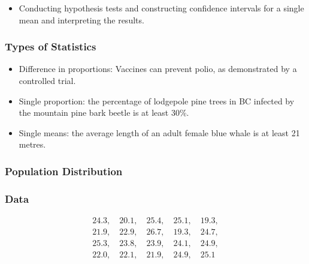 \documentclass{beamer}
\begin{document}
\begin{frame}
  \begin{itemize}
    \item[] 
      Conducting hypothesis tests and constructing confidence intervals
      for a single mean and interpreting the results.
  \end{itemize}
\end{frame}

\begin{frame}
  \frametitle{Types of Statistics}
  \begin{itemize}
    \item[] 
      Difference in proportions: Vaccines can prevent polio, as
      demonstrated by a controlled trial. 
      \vspace{0.5cm}
    \item[] 
      Single proportion: the percentage of lodgepole pine trees in BC
      infected by the mountain pine bark beetle is at least 30\%.
      \vspace{0.5cm}
    \item[] 
      Single means: the average length of an adult female blue whale
      is at least 21 metres. 
  \end{itemize}
\end{frame}

\begin{frame}
  \frametitle{Population Distribution}
  \centering
\end{frame}

\begin{frame}
  \frametitle{Data}
  \begin{displaymath}
    \begin{array}{l}
      24.3, \quad 
      20.1, \quad 
      25.4, \quad 
      25.1, \quad 
      19.3, \\[1em]
      21.9, \quad 
      22.9, \quad 
      26.7, \quad 
      19.3, \quad 
      24.7, \\[1em]
      25.3, \quad 
      23.8, \quad 
      23.9, \quad 
      24.1, \quad 
      24.9, \\[1em]
      22.0, \quad
      22.1, \quad 
      21.9, \quad 
      24.9, \quad 
      25.1 
    \end{array}
  \end{displaymath} 
\end{frame}
\end{document}
